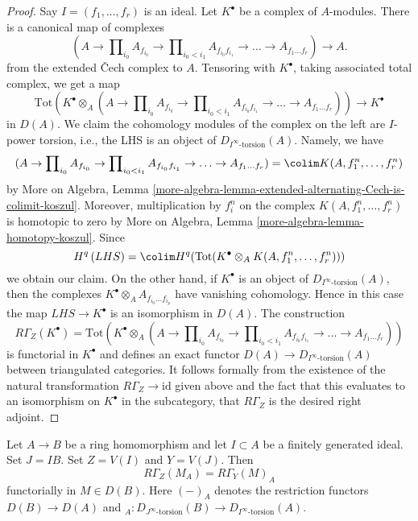 \begin{proof}
Say $I = (f_1, \ldots, f_r)$ is an ideal.
Let $K^\bullet$ be a complex of $A$-modules.
There is a canonical map of complexes
$$
(A \to \prod\nolimits_{i_0} A_{f_{i_0}} \to
\prod\nolimits_{i_0 < i_1} A_{f_{i_0}f_{i_1}} \to
\ldots \to A_{f_1\ldots f_r}) \longrightarrow A.
$$
from the extended {\v C}ech complex to $A$.
Tensoring with $K^\bullet$, taking associated total complex,
we get a map
$$
\text{Tot}\left(
K^\bullet \otimes_A
(A \to \prod\nolimits_{i_0} A_{f_{i_0}} \to
\prod\nolimits_{i_0 < i_1} A_{f_{i_0}f_{i_1}} \to
\ldots \to A_{f_1\ldots f_r})\right)
\longrightarrow
K^\bullet
$$
in $D(A)$. We claim the cohomology modules of the complex on the left are
$I$-power torsion, i.e., the LHS is an object of
$D_{I^\infty\text{-torsion}}(A)$. Namely, we have
$$
(A \to \prod\nolimits_{i_0} A_{f_{i_0}} \to
\prod\nolimits_{i_0 < i_1} A_{f_{i_0}f_{i_1}} \to
\ldots \to A_{f_1\ldots f_r}) = \colim K(A, f_1^n, \ldots, f_r^n)
$$
by More on Algebra, Lemma
\ref{more-algebra-lemma-extended-alternating-Cech-is-colimit-koszul}.
Moreover, multiplication by $f_i^n$ on the complex
$K(A, f_1^n, \ldots, f_r^n)$ is homotopic to zero by
More on Algebra, Lemma \ref{more-algebra-lemma-homotopy-koszul}.
Since
$$
H^q\left( LHS \right) =
\colim H^q(\text{Tot}(K^\bullet \otimes_A K(A, f_1^n, \ldots, f_r^n)))
$$
we obtain our claim. On the other hand, if $K^\bullet$ is an
object of $D_{I^\infty\text{-torsion}}(A)$, then the complexes
$K^\bullet \otimes_A A_{f_{i_0} \ldots f_{i_p}}$ have vanishing
cohomology. Hence in this case the map $LHS \to K^\bullet$
is an isomorphism in $D(A)$. The construction
$$
R\Gamma_Z(K^\bullet) =
\text{Tot}\left(
K^\bullet \otimes_A
(A \to \prod\nolimits_{i_0} A_{f_{i_0}} \to
\prod\nolimits_{i_0 < i_1} A_{f_{i_0}f_{i_1}} \to
\ldots \to A_{f_1\ldots f_r})\right)
$$
is functorial in $K^\bullet$ and defines an exact functor
$D(A) \to D_{I^\infty\text{-torsion}}(A)$ between
triangulated categories. It follows formally from the
existence of the natural transformation $R\Gamma_Z \to \text{id}$
given above and the fact that this evaluates to an isomorphism
on $K^\bullet$ in the subcategory, that $R\Gamma_Z$ is the desired
right adjoint.
\end{proof}

\begin{lemma}
\label{lemma-local-cohomology-and-restriction}
Let $A \to B$ be a ring homomorphism and let $I \subset A$
be a finitely generated ideal. Set $J = IB$. Set $Z = V(I)$
and $Y = V(J)$. Then
$$
R\Gamma_Z(M_A) = R\Gamma_Y(M)_A
$$
functorially in $M \in D(B)$. Here $(-)_A$ denotes the restriction
functors $D(B) \to D(A)$ and
${}_A : D_{J^\infty\text{-torsion}}(B) \to D_{I^\infty\text{-torsion}}(A)$.
\end{lemma}

